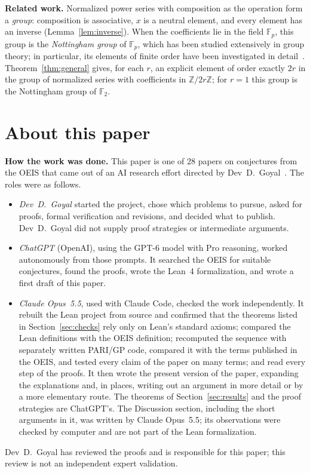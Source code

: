 \documentclass[11pt,a4paper]{article}
\theoremstyle{definition}
\theoremstyle{remark}
\newcommand{\Z}{\mathbb{Z}}
\newcommand{\F}{\mathbb{F}}
\newcommand{\para}[1]{\par\medskip\noindent\textbf{#1}\enspace}
\begin{document}
\para{Related work.} Normalized power series with composition as the operation form a \emph{group}: composition is
associative, $x$ is a neutral element, and every element has an inverse (Lemma~\ref{lem:inverse}). When the
coefficients lie in the field $\F_p$, this group is the \emph{Nottingham group} of $\F_p$, which has been studied
extensively in group theory; in particular, its elements of finite order have been investigated in
detail~\cite{camina}. Theorem~\ref{thm:general} gives, for each $r$, an explicit element of order exactly $2r$ in the
group of normalized series with coefficients in $\Z/2r\Z$; for $r=1$ this group is the Nottingham group of $\F_2$.

\section*{About this paper}\label{sec:about}
\para{How the work was done.}
This paper is one of 28 papers on conjectures from the OEIS that came out of an AI research effort directed by
Dev~D.~Goyal~\cite{repo}. The roles were as follows.
\begin{itemize}
\item \emph{Dev~D.~Goyal} started the project, chose which problems to pursue, asked for proofs, formal verification and
revisions, and decided what to publish. Dev~D.~Goyal did not supply proof strategies or intermediate arguments.
\item \emph{ChatGPT} (OpenAI), using the GPT-6 model with Pro reasoning, worked autonomously from those prompts. It
searched the OEIS for suitable conjectures, found the proofs, wrote the Lean~4 formalization, and wrote a first draft
of this paper.
\item \emph{Claude Opus~5.5}, used with Claude Code, checked the work independently. It rebuilt the Lean project from source and confirmed that the theorems listed in Section~\ref{sec:checks} rely only on
Lean's standard axioms; compared the Lean definitions with the OEIS definition; recomputed the sequence with separately
written PARI/GP code, compared it with the terms published in the OEIS, and tested every claim of the paper on many
terms; and read every step of the proofs. It then wrote the present version of the paper, expanding the
explanations and, in places, writing out an argument in more detail or by a more elementary route. The theorems of
Section~\ref{sec:results} and the proof strategies are ChatGPT's. The Discussion section, including the short arguments
in it, was written by Claude Opus~5.5; its observations were checked by computer and are not part of the Lean
formalization.
\end{itemize}
Dev~D.~Goyal has reviewed the proofs and is responsible for this paper; this review is not an independent expert
validation.
\end{document}
